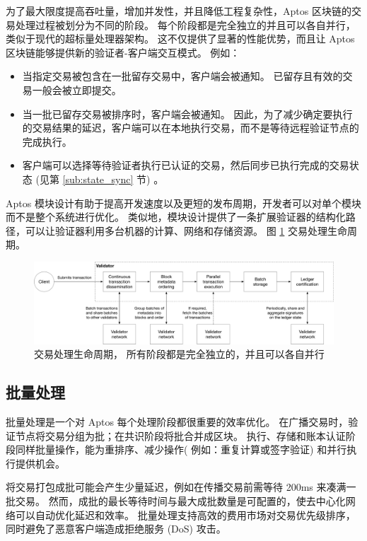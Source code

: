 \documentclass{article}
\begin{document}
为了最大限度提高吞吐量，增加并发性，并且降低工程复杂性，Aptos 区块链的交易处理过程被划分为不同的阶段。 每个阶段都是完全独立的并且可以各自并行，类似于现代的超标量处理器架构。 这不仅提供了显著的性能优势，而且让 Aptos 区块链能够提供新的验证者-客户端交互模式。 例如：

\begin{itemize}
\item 当指定交易被包含在一批留存交易中，客户端会被通知。 已留存且有效的交易一般会被立即提交。 

\item 当一批已留存交易被排序时，客户端会被通知。 因此，为了减少确定要执行的交易结果的延迟，客户端可以在本地执行交易，而不是等待远程验证节点的完成执行。

\item 客户端可以选择等待验证者执行已认证的交易，然后同步已执行完成的交易状态 (见第 \ref{sub:state_sync} 节) 。

\end{itemize}

Aptos 模块设计有助于提高开发速度以及更短的发布周期，开发者可以对单个模块而不是整个系统进行优化。 类似地，模块设计提供了一条扩展验证器的结构化路径，可以让验证器利用多台机器的计算、网络和存储资源。 图 \ref{fig:pipeline} 交易处理生命周期。


\begin{figure}
\centering
\includegraphics[width=1.0\textwidth]{pipeline.pdf}
\caption{\label{fig:pipeline}交易处理生命周期， 所有阶段都是完全独立的，并且可以各自并行}
\end{figure}

\subsection{批量处理}

批量处理是一个对 Aptos 每个处理阶段都很重要的效率优化。 在广播交易时，验证节点将交易分组为批；在共识阶段将批合并成区块。 执行、存储和账本认证阶段同样批量操作，能为重排序、减少操作( 例如：重复计算或签字验证) 和并行执行提供机会。

将交易打包成批可能会产生少量延迟，例如在传播交易前需等待 200ms 来凑满一批交易。 然而，成批的最长等待时间与最大成批数量是可配置的，使去中心化网络可以自动优化延迟和效率。 批量处理支持高效的费用市场对交易优先级排序，同时避免了恶意客户端造成拒绝服务 (DoS) 攻击。
\end{document}
